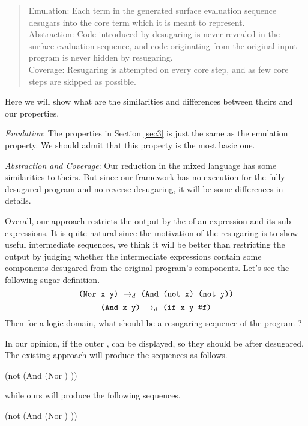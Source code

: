 \begin{quote}
Emulation:
Each term in the generated surface evaluation sequence desugars into the core term which it is meant to represent.\\
Abstraction:
Code introduced by desugaring is never revealed in the surface evaluation sequence, and code originating from the original input program is never hidden by resugaring.\\
Coverage: Resugaring is attempted on every core step, and as few core steps are skipped as possible.\\
\end{quote}
Here we will show what are the similarities and differences between theirs and our properties.

\emph{Emulation}: The properties in Section \ref{sec3} is just the same as the emulation property. We should admit that this property is the most basic one.

\emph{Abstraction and Coverage}: Our reduction in the mixed language has some similarities to theirs. But since our framework has no execution for the fully desugared program and no reverse desugaring, it will be some differences in details.

Overall, our approach restricts the output by the  of an expression and its sub-expressions. It is quite natural since the motivation of the resugaring is to show useful intermediate sequences, we think it will be better than restricting the output by judging whether the intermediate expressions contain some components desugared from the original program's components. Let's see the following sugar definition.
\[
\texttt{(Nor~x~y)} ~\rightarrow_d~ \texttt{(And~(not~x)~(not~y))}
\]
\[
\texttt{(And~x~y)} ~\rightarrow_d~ \texttt{(if~x~y~\#f)}
\]
Then for a logic domain, what should be a resugaring sequence of the program  ?

In our opinion, if the outer ,  can be displayed, so they should be after desugared.
The existing approach will produce the sequences as follows.
\begin{footnotesize}
\begin{Codes}
    (not (And (Nor \false \true) \true))
\OneStep{ \true}
\end{Codes}
\end{footnotesize}
while ours will produce the following sequences.
\begin{footnotesize}
\begin{Codes}
    (not (And (Nor \false \true) \true))
\OneStep{ \true}
\end{Codes}
\end{footnotesize}

